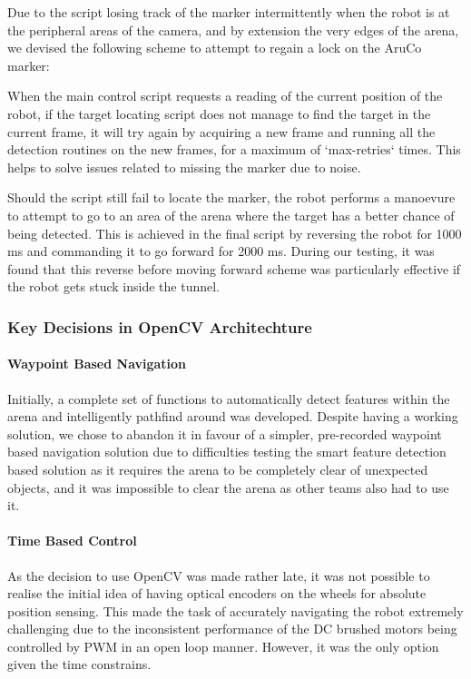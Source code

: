\documentclass{article}
\begin{document}
Due to the script losing track of the marker intermittently when the robot is at the peripheral areas of the camera, and by extension the very edges of the arena, we devised the following scheme to attempt to regain a lock on the AruCo marker:

When the main control script requests a reading of the current position of the robot, if the target locating script does not manage to find the target in the current frame, it will try again by acquiring a new frame and running all the detection routines on the new frames, for a maximum of `max-retries` times. This helps to solve issues related to missing the marker due to noise.

Should the script still fail to locate the marker, the robot performs a manoevure to attempt to go to an area of the arena where the target has a better chance of being detected. This is achieved in the final script by reversing the robot for 1000 ms and commanding it to go forward for 2000 ms. During our testing, it was found that this reverse before moving forward scheme was particularly effective if the robot gets stuck inside the tunnel.

\subsubsection{Key Decisions in OpenCV Architechture}

\paragraph{Waypoint Based Navigation}

Initially, a complete set of functions to automatically detect features within the arena and intelligently pathfind around was developed. Despite having a working solution, we chose to abandon it in favour of a simpler, pre-recorded waypoint based navigation solution due to difficulties testing the smart feature detection based solution as it requires the arena to be completely clear of unexpected objects, and it was impossible to clear the arena as other teams also had to use it.

\paragraph{Time Based Control}

As the decision to use OpenCV was made rather late, it was not possible to realise the initial idea of having optical encoders on the wheels for absolute position sensing. This made the task of accurately navigating the robot extremely challenging due to the inconsistent performance of the DC brushed motors being controlled by PWM in an open loop manner. However, it was the only option given the time constrains.
\end{document}
